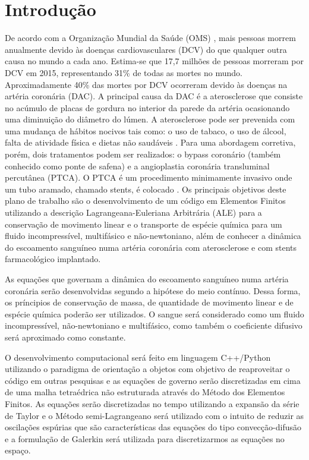\section{Introdução}

De acordo com a Organização Mundial da Saúde (OMS) \cite{oms}, mais pessoas morrem anualmente devido às doenças cardiovasculares (DCV) do que qualquer outra causa no mundo a cada ano. 
Estima-se que 17,7 milhões de pessoas morreram por DCV em 2015, representando 31\% de todas as mortes no mundo. 
Aproximadamente 40\% das mortes por DCV ocorreram devido às doenças na artéria coronária (DAC). 
A principal causa da DAC é a aterosclerose que consiste no acúmulo de placas de gordura no interior da parede da artéria ocasionando uma diminuição do diâmetro do lúmen. 
A aterosclerose pode ser prevenida com uma mudança de hábitos nocivos tais como: o uso de tabaco, o uso de álcool, falta de atividade física e dietas não saudáveis \cite{spring2013}. 
Para uma abordagem corretiva, porém, dois tratamentos podem ser realizados: o bypass coronário (também conhecido como ponte de safena) e a angioplastia coronária transluminal percutânea (PTCA). 
O PTCA é um procedimento minimamente invasivo onde um tubo aramado, chamado stents, é colocado \cite{sigwart1987}.
Os principais objetivos deste plano de trabalho são o desenvolvimento de um código em Elementos Finitos utilizando a descrição Lagrangeana-Euleriana Arbitrária (ALE) \cite{donea2004} para a conservação de movimento linear e o transporte de espécie química para um fluido incompressível, multifásico e não-newtoniano, além de 
conhecer a dinâmica do escoamento sanguíneo numa artéria coronária com aterosclerose e com stents farmacológico implantado.

\bigskip
As equações que governam a dinâmica do escoamento sanguíneo numa artéria coronária serão desenvolvidas segundo a hipótese do meio contínuo. 
Dessa forma, os príncipios de conservação de massa, de quantidade de movimento linear e de espécie química poderão ser utilizados. 
O sangue será considerado como um fluido incompressível, não-newtoniano e multifásico, como também o coeficiente difusivo será aproximado como constante. 
 
\bigskip
O desenvolvimento computacional será feito em linguagem C++/Python \cite{c++} \cite{python} utilizando o paradigma de orientação a objetos com objetivo de reaproveitar o código em outras pesquisas e 
as equações de governo serão discretizadas em cima de uma malha tetraédrica não estruturada através do Método dos Elementos Finitos. 
As equações serão discretizadas no tempo utilizando a expansão da série de Taylor e 
o Método semi-Lagrangeano \cite{pironneau1982} será utilizado com o intuito de reduzir as oscilações espúrias que são características das equações do tipo convecção-difusão e 
a formulação de Galerkin \cite{zienkiewicz1965} será utilizada para discretizarmos as equações no espaço. 

